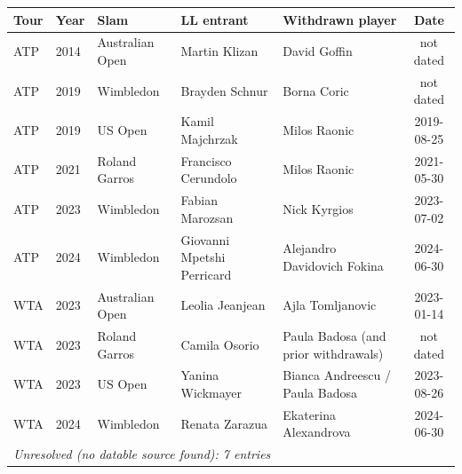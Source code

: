 \begin{tabular}{lllllc}
\toprule
Tour & Year & Slam & LL entrant & Withdrawn player & Date \\
\midrule
ATP & 2014 & Australian Open & Martin Klizan & David Goffin & not dated \\
ATP & 2019 & Wimbledon & Brayden Schnur & Borna Coric & not dated \\
ATP & 2019 & US Open & Kamil Majchrzak & Milos Raonic & 2019-08-25 \\
ATP & 2021 & Roland Garros & Francisco Cerundolo & Milos Raonic & 2021-05-30 \\
ATP & 2023 & Wimbledon & Fabian Marozsan & Nick Kyrgios & 2023-07-02 \\
ATP & 2024 & Wimbledon & Giovanni Mpetshi Perricard & Alejandro Davidovich Fokina & 2024-06-30 \\
WTA & 2023 & Australian Open & Leolia Jeanjean & Ajla Tomljanovic & 2023-01-14 \\
WTA & 2023 & Roland Garros & Camila Osorio & Paula Badosa (and prior withdrawals) & not dated \\
WTA & 2023 & US Open & Yanina Wickmayer & Bianca Andreescu / Paula Badosa & 2023-08-26 \\
WTA & 2024 & Wimbledon & Renata Zarazua & Ekaterina Alexandrova & 2024-06-30 \\
\midrule
\multicolumn{6}{l}{\textit{Unresolved (no datable source found): 7 entries}} \\
\bottomrule
\end{tabular}
